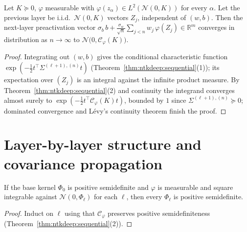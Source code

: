 \begin{theorem}\label{thm:ntkdeep:sequentialLimit}
  \leanok
Let $K\succeq0$, $\varphi$ measurable with $\varphi(z_\alpha)\in L^2(\mathcal N(0,K))$ for every $\alpha$. Let the previous layer be i.i.d.\ $\mathcal N(0,K)$ vectors $Z_j$, independent of $(w,b)$. Then the next-layer preactivation vector
$\sigma_b\,b+\frac{\sigma_w}{\sqrt n}\sum_{j<n}w_j\,\varphi(Z_j)\in\mathbb R^m$ converges in distribution as $n\to\infty$ to $\mathcal N\bigl(0,\mathcal C_\varphi(K)\bigr)$.
\end{theorem}

\begin{proof}
  \leanok
Integrating out $(w,b)$ gives the conditional characteristic function $\exp(-\frac12t^\top\Sigma^{(\ell+1),(n)}t)$ (Theorem~\ref{thm:ntkdeep:sequential}(1)); its expectation over $(Z_j)$ is an integral against the infinite product measure. By Theorem~\ref{thm:ntkdeep:sequential}(2) and continuity the integrand converges almost surely to
$\exp(-\frac12t^\top\mathcal C_\varphi(K)t)$, bounded by $1$ since $\Sigma^{(\ell+1),(n)}\succeq0$; dominated convergence and L\'evy's continuity theorem finish the proof.
\end{proof}


\section{Layer-by-layer structure and covariance propagation}\label{sec:ntkdeep:layers}

\begin{lemma}\label{lem:ntkdeep:layerKernelPsd}
  \leanok
If the base kernel $\Phi_0$ is positive semidefinite and $\varphi$ is measurable and square integrable against $\mathcal N(0,\Phi_\ell)$ for each $\ell$, then every $\Phi_\ell$ is positive semidefinite.
\end{lemma}

\begin{proof}
  \leanok
Induct on $\ell$ using that $\mathcal C_\varphi$ preserves positive semidefiniteness (Theorem~\ref{thm:ntkdeep:sequential}(2)).
\end{proof}

